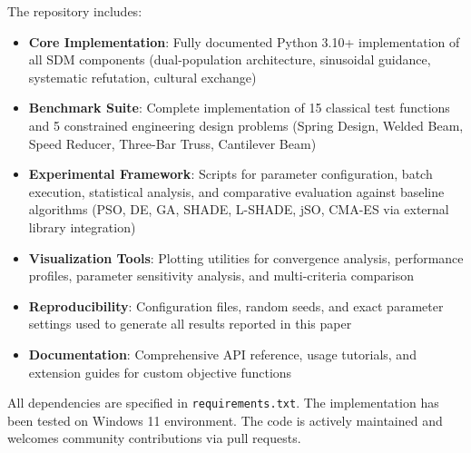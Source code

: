 \documentclass[11pt]{article}
\begin{document}
The repository includes:
\begin{itemize}
\item \textbf{Core Implementation}: Fully documented Python 3.10+ implementation of all SDM components (dual-population architecture, sinusoidal guidance, systematic refutation, cultural exchange)
\item \textbf{Benchmark Suite}: Complete implementation of 15 classical test functions and 5 constrained engineering design problems (Spring Design, Welded Beam, Speed Reducer, Three-Bar Truss, Cantilever Beam)
\item \textbf{Experimental Framework}: Scripts for parameter configuration, batch execution, statistical analysis, and comparative evaluation against baseline algorithms (PSO, DE, GA, SHADE, L-SHADE, jSO, CMA-ES via external library integration)
\item \textbf{Visualization Tools}: Plotting utilities for convergence analysis, performance profiles, parameter sensitivity analysis, and multi-criteria comparison
\item \textbf{Reproducibility}: Configuration files, random seeds, and exact parameter settings used to generate all results reported in this paper
\item \textbf{Documentation}: Comprehensive API reference, usage tutorials, and extension guides for custom objective functions
\end{itemize}

All dependencies are specified in \texttt{requirements.txt}. The implementation has been tested on Windows 11 environment. The code is actively maintained and welcomes community contributions via pull requests.


\end{document}
